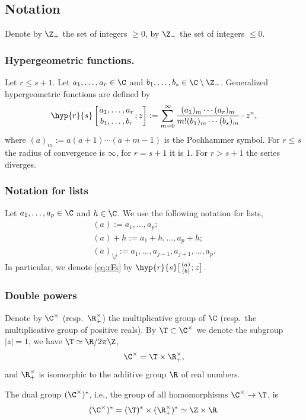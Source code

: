 \subsection{Notation}
Denote by $\Z_+$ the set of integers $\ge 0$, by $\Z_-$ the set of integers $\le 0$.

\subsubsection{Hypergeometric functions.}
Let $r\le s+1$.
Let $a_1,\dots,a_r\in\C$ and $b_1,\dots,b_s\in\C\setminus\Z_-$.
Generalized hypergeometric functions are defined by
\begin{equation}
\hyp{r}{s}\left[\genfrac{}{}{0pt}{}{a_1,\dots,a_r}{b_1,\dots,b_r};z\right]
:=\sum_{m=0}^\infty
\frac{(a_1)_m\cdots (a_r)_m}{m! (b_1)_m\cdots (b_s)_m}\cdot z^n,
\label{eq:rFs}
\end{equation}
where $(a)_m:=a(a+1)\cdots(a+m-1)$ is the Pochhammer symbol.
For $r\le s$ the radius of convergence is $\infty$, for $r=s+1$ it is $1$.
For $r>s+1$ the series diverges.

\subsubsection{Notation for lists}
Let $a_1, \dots, a_p\in \C$ and $h\in\C$.
We use the following notation for lists,
\begin{gather*}
(a):= a_1, \dots, a_p;\\
(a)+h:= a_1+h, \dots, a_p+h;\\
(a)_{\setminus j}:= a_1,\dots,a_{j-1},a_{j+1},\dots,a_p.
\end{gather*}
In particular, we denote \eqref{eq:rFs}
by $\hyp{r}{s}\big[\genfrac{}{}{0pt}{}{(a)}{(b)};z\big]$.

\subsubsection{Double powers}
Denote by $\C^\times$ (resp.\ $\R^\times_+$) the multiplicative group of $\C$
(resp.\ the multiplicative group of positive reals).
By $\T\subset \C^\times$ we denote the subgroup
$|z|=1$, we have $\T\simeq\R/2\pi \Z$,
\begin{equation*}
\C^\times= \T\times \R^\times_+,
\end{equation*}
and $\R^\times_+$ is isomorphic to the additive group $\R$ of real numbers.

The dual group $(\C^\times)^*$, i.e., the group of all homomorphisms
$\C^\times\to \T$, is
\begin{equation*}
(\C^\times)^*= (\T)^*\times (\R^\times_+)^*\simeq \Z\times \R.
\end{equation*}


